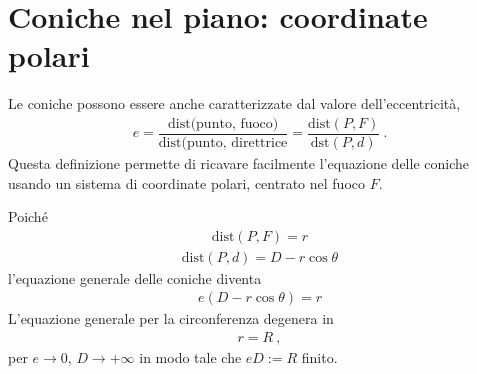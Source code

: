 \documentclass[letterpaper,10pt,english]{jupyterBook}
\begin{document}
\section{Coniche nel piano: coordinate polari}
\label{\detokenize{ch/analytic_geometry/analytic_geometry_2d/conics-polar:coniche-nel-piano-coordinate-polari}}\label{\detokenize{ch/analytic_geometry/analytic_geometry_2d/conics-polar:geometry-analytic-2d-conics-polar}}\label{\detokenize{ch/analytic_geometry/analytic_geometry_2d/conics-polar::doc}}
\sphinxAtStartPar
Le coniche possono essere anche caratterizzate dal valore dell’eccentricità,
\begin{equation*}
\begin{split}e = \dfrac{\text{dist(punto, fuoco)}}{\text{dist(punto, direttrice}} = \dfrac{\text{dist}(P,F)}{\text{dst}(P,d)} \ .\end{split}
\end{equation*}
\sphinxAtStartPar
Questa definizione permette di ricavare facilmente l’equazione delle coniche usando un sistema di coordinate polari, centrato nel fuoco \(F\).

\sphinxAtStartPar
Poiché
\begin{equation*}
\begin{split}\text{dist}(P,F) = r\end{split}
\end{equation*}\begin{equation*}
\begin{split}\text{dist}(P,d) = D - r \cos \theta\end{split}
\end{equation*}
\sphinxAtStartPar
l’equazione generale delle coniche diventa
\begin{equation*}
\begin{split}e \left( D - r \cos \theta \right) = r\end{split}
\end{equation*}
\sphinxAtStartPar
{} L’equazione generale per la circonferenza degenera in
\begin{equation*}
\begin{split}r = R \ ,\end{split}
\end{equation*}
\sphinxAtStartPar
per \(e \rightarrow 0\), \(D \rightarrow +\infty\) in modo tale che \(e D := R\) finito.

\sphinxAtStartPar
{}

\sphinxAtStartPar
{}
\end{document}
